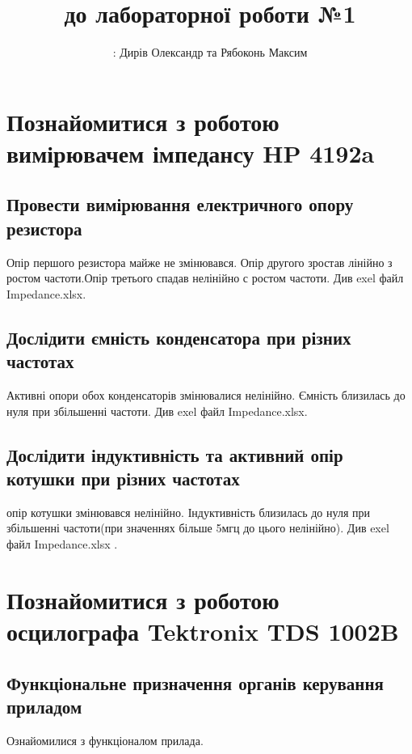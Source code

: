 \documentclass[a4paper,12pt]{article}
\begin{document}
\title{ до лабораторної роботи №1\linebreak }
\author{: Дирів Олександр та Рябоконь Максим}
\date{}
\maketitle
\newpage
{\Large\tableofcontents}
\newpage
\section{Познайомитися з роботою вимірювачем імпедансу HP 4192a}
\subsection{Провести вимірювання електричного опору резистора}
\quad Опір першого резистора майже не змінювався. Опір другого зростав лінійно з ростом частоти.Опір третього спадав нелінійно с ростом частоти. Див exel файл Impedance.xlsx.
\subsection{Дослідити ємність конденсатора при різних частотах}
Активні опори обох конденсаторів змінювалися нелінійно. Ємність близилась до нуля при збільшенні частоти. Див exel файл Impedance.xlsx.
\subsection{Дослідити індуктивність та активний опір котушки при різних частотах}
 опір котушки змінювався нелінійно. Індуктивність близилась до нуля при збільшенні частоти(при значеннях більше 5мгц до цього нелінійно). Див exel файл Impedance.xlsx .
\clearpage
\section{Познайомитися з роботою осцилографа Tektronix TDS 1002B}
\subsection{Функціональне призначення органів керування приладом}
Ознайомилися з функціоналом прилада.
\end{document}
